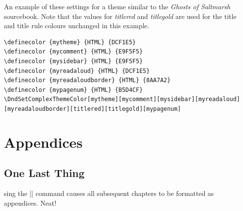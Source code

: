 \documentclass[letterpaper,twocolumn,openany,nodeprecatedcode]{dndbook}
\begin{document}
An example of these settings for a theme similar to the \textit{Ghosts of Saltmarsh} sourcebook. Note that the values for \textit{titlered} and \textit{titlegold} are used for the title and title rule colours unchanged in this example.

\begin{lstlisting}[basicstyle=\ttfamily\small]
\definecolor {mytheme} {HTML} {DCF1E5}
\definecolor {mycomment} {HTML} {E9F5F5}
\definecolor {mysidebar} {HTML} {E9F5F5}
\definecolor {myreadaloud} {HTML} {DCF1E5}
\definecolor {myreadaloudborder} {HTML} {8AA7A2}
\definecolor {mypagenum} {HTML} {B5D4CF}
\DndSetComplexThemeColor[mytheme][mycomment][mysidebar][myreadaloud][myreadaloudborder][titlered][titlegold][mypagenum]
\end{lstlisting}

\part{Appendices}

\appendix

\chapter{One Last Thing}

sing the |\appendix| command causes all subsequent chapters to be formatted as appendices. Neat!
\end{document}
